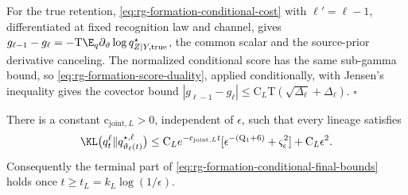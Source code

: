 For the true retention, \cref{eq:rg-formation-conditional-cost} with
\(\ell'=\ell-1\), differentiated at fixed recognition law and channel, gives
\(g_{\ell-1}-g_\ell=-\mathrm T\E_q\partial_\vartheta\log q^\star_{Z\mid Y,\mathrm{true}}\),
the common scalar and the source-prior derivative canceling. The normalized
conditional score has the same sub-gamma bound, so
\cref{eq:rg-formation-score-duality}, applied conditionally, with Jensen's
inequality gives the covector bound
\(|g_{\ell-1}-g_\ell|\le\mathrm C_L\mathrm T(\sqrt{\Delta_\ell}+\Delta_\ell)\).
\(\square\)

There is a constant \(\mathrm c_{\mathrm{joint},L}>0\), independent of
\(\epsilon\), such that every lineage satisfies
\begin{equation}
 \KL\bigl(q_t^\ell\Vert q^{\star,\ell}_{\vartheta_\ell(t)}\bigr)
 \le \mathrm C_L e^{-\mathrm c_{\mathrm{joint},L}t}
           [\epsilon^{-(\mathrm Q_1+6)}+\varsigma_\epsilon^2]
       +\mathrm C_L\epsilon^2.
 \label{eq:rg-formation-terminal-joint-bound}
\end{equation}
Consequently the terminal part of
\cref{eq:rg-formation-conditional-final-bounds} holds once
\(t\ge t_L=k_L\log(1/\epsilon)\). 

